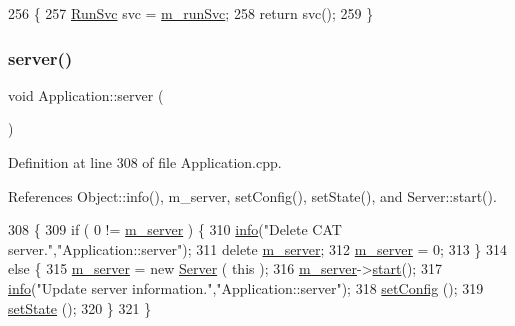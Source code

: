 \begin{DoxyCode}
256                        \{
257     \hyperlink{Application_8h_a59643f52f9391fa83f137814aaae27ef}{RunSvc} svc = \hyperlink{classApplication_ad2c061af424280151c86b9b56d9724d3}{m\_runSvc};
258     \textcolor{keywordflow}{return} svc();
259   \}
\end{DoxyCode}
\mbox{\label{classApplication_a1712ebe326b3d1855b839c59f52633d8}} 
\subsubsection{\texorpdfstring{server()}{server()}}
{\footnotesize\ttfamily void Application\+::server (\begin{DoxyParamCaption}{ }\end{DoxyParamCaption})}



Definition at line 308 of file Application.\+cpp.



References Object\+::info(), m\+\_\+server, set\+Config(), set\+State(), and Server\+::start().


\begin{DoxyCode}
308                             \{
309   \textcolor{keywordflow}{if} ( 0 != \hyperlink{classApplication_a5e6085b0f322d5036177b16113a75b56}{m\_server} ) \{
310     \hyperlink{classObject_a644fd329ea4cb85f54fa6846484b84a8}{info}(\textcolor{stringliteral}{"Delete CAT server."},\textcolor{stringliteral}{"Application::server"});
311     \textcolor{keyword}{delete} \hyperlink{classApplication_a5e6085b0f322d5036177b16113a75b56}{m\_server};
312     \hyperlink{classApplication_a5e6085b0f322d5036177b16113a75b56}{m\_server} = 0;
313   \}
314   \textcolor{keywordflow}{else} \{
315     \hyperlink{classApplication_a5e6085b0f322d5036177b16113a75b56}{m\_server} = \textcolor{keyword}{new} \hyperlink{classServer}{Server} ( \textcolor{keyword}{this} );
316     \hyperlink{classApplication_a5e6085b0f322d5036177b16113a75b56}{m\_server}->\hyperlink{classServer_a039cc5b24c26fa5bb8145335f27bb28e}{start}();
317     \hyperlink{classObject_a644fd329ea4cb85f54fa6846484b84a8}{info}(\textcolor{stringliteral}{"Update server information."},\textcolor{stringliteral}{"Application::server"});
318     \hyperlink{classApplication_a46614964f765fd5374b216582b599bcb}{setConfig} ();
319     \hyperlink{classApplication_a4a86c9bbf7851753c7b2bc03211092fb}{setState}  ();
320   \}
321 \}
\end{DoxyCode}
\mbox{\label{classApplication_a46614964f765fd5374b216582b599bcb}} 
